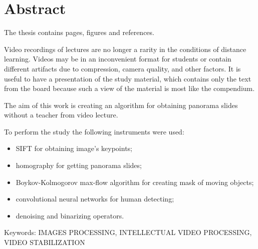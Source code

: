\chapter*{Abstract}

The thesis contains
\pageref{LastPage}
pages,
figures
and
 references.

Video recordings of lectures are no longer a rarity in
the conditions of distance learning.
Videos may be in an inconvenient format for
students or contain different artifacts due
to compression, camera quality, and other factors.
It is useful to have a presentation of the study material,
which contains only the text from the board
because such a view of the material is most
like the compendium.

The aim of this work
is creating an algorithm for obtaining panorama
slides without a teacher from video lecture.

To perform the study the following instruments were used:
\begin{itemize}
  \item
        SIFT for obtaining image's keypoints;
  \item
        homography for getting panorama slides;
  \item
        Boykov-Kolmogorov max-flow algorithm for creating mask of
        moving objects;
  \item
        convolutional neural networks for human detecting;
  \item
        denoising and binarizing operators.
\end{itemize}

Keywords:
\MakeUppercase{images processing, intellectual video
  processing, video stabilization}
